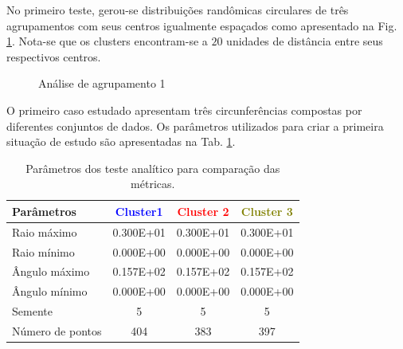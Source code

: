 No primeiro teste, gerou-se distribuições randômicas circulares de três agrupamentos com seus centros igualmente espaçados como apresentado na Fig. \ref{AC1}. Nota-se que os clusters encontram-se a $20$ unidades de distância entre seus respectivos centros. 

\begin{figure}[H]
	\centering
	\setlength{\fboxsep}{8pt}
	\setlength{\fboxrule}{0.1pt}
	\caption{Análise de agrupamento 1}
	\label{AC1}
\end{figure}

O primeiro caso estudado apresentam três circunferências compostas por diferentes conjuntos de dados. Os parâmetros utilizados para criar a primeira situação de estudo são apresentadas na Tab. \ref{analise1}.

\begin{table}[H]
	\centering
	\caption{Parâmetros dos teste analítico para comparação das métricas.}
	\label{analise1}
	\begin{tabular}{lccc}
		\hline
		Parâmetros       & \textcolor{blue}{Cluster1} & \textcolor{red}{Cluster 2} & \textcolor{olive}{Cluster 3} \\ \hline
		Raio máximo      & 0.300E+01 & 0.300E+01 & 0.300E+01 \\
		Raio mínimo      & 0.000E+00 & 0.000E+00 & 0.000E+00 \\
		Ângulo máximo    & 0.157E+02 & 0.157E+02 & 0.157E+02 \\
		Ângulo mínimo    & 0.000E+00 & 0.000E+00 & 0.000E+00 \\
		Semente                & 5                 & 5                  & 5         \\
		Número de pontos & 404       & 383       & 397   \\        \hline
	\end{tabular}
\end{table}

